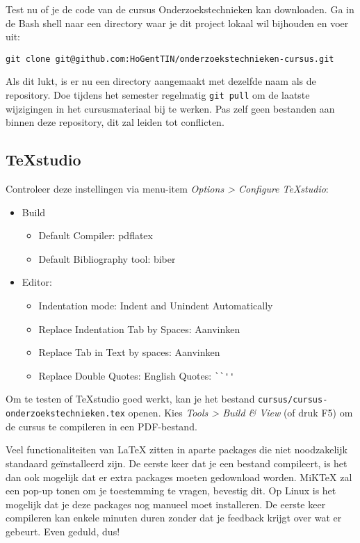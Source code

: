 Test nu of je de code van de cursus Onderzoekstechnieken kan downloaden. Ga in de Bash shell naar een directory waar je dit project lokaal wil bijhouden en voer uit:

\begin{verbatim}
git clone git@github.com:HoGentTIN/onderzoekstechnieken-cursus.git
\end{verbatim}

Als dit lukt, is er nu een directory aangemaakt met dezelfde naam als de repository. Doe tijdens het semester regelmatig \texttt{git pull} om de laatste wijzigingen in het cursusmateriaal bij te werken. Pas zelf geen bestanden aan binnen deze repository, dit zal leiden tot conflicten.

\subsection{TeXstudio}

Controleer deze instellingen via menu-item \emph{Options > Configure TeXstudio}:

\begin{itemize}
  \item Build
  \begin{itemize}
    \item Default Compiler: pdflatex
    \item Default Bibliography tool: biber
  \end{itemize}
  \item Editor:
  \begin{itemize}
    \item Indentation mode: Indent and Unindent Automatically
    \item Replace Indentation Tab by Spaces: Aanvinken
    \item Replace Tab in Text by spaces: Aanvinken
    \item Replace Double Quotes: English Quotes: \verb|``''|
  \end{itemize}

\end{itemize}

Om te testen of TeXstudio goed werkt, kan je het bestand \texttt{cursus/cursus-onderzoekstechnieken.tex} openen. Kies \emph{Tools > Build \& View} (of druk F5) om de cursus te compileren in een PDF-bestand.

Veel functionaliteiten van \LaTeX{} zitten in aparte packages die niet noodzakelijk standaard geïnstalleerd zijn. De eerste keer dat je een bestand compileert, is het dan ook mogelijk dat er extra packages moeten gedownload worden. MiK\TeX{} zal een pop-up tonen om je toestemming te vragen, bevestig dit. Op Linux is het mogelijk dat je deze packages nog manueel moet installeren. De eerste keer compileren kan enkele minuten duren zonder dat je feedback krijgt over wat er gebeurt. Even geduld, dus!

